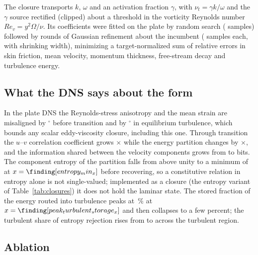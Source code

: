 \documentclass[lineno]{jfm}
\begin{document}
The closure transports $k$, $\omega$ and an activation fraction $\gamma$,
with $\nu_t = \gamma k/\omega$ and the $\gamma$ source rectified (clipped)
about a threshold in the vorticity Reynolds number $Re_v = y^2\Omega/\nu$.
Its \result[NFittedCoeffs]{} coefficients were fitted on the plate by random
search (\result[NRandom]{} samples) followed by \result[NRefineRounds]{}
rounds of Gaussian refinement about the incumbent (\result[NRefine]{}
samples each, with shrinking width), minimizing a target-normalized sum of
relative errors in skin friction, mean velocity, momentum thickness,
free-stream decay and turbulence energy.

\subsection{What the DNS says about the form}\label{sec:structure}

In the plate DNS the Reynolds-stress anisotropy and the mean strain are
misaligned by $^\circ$ before
transition and by $^\circ$ in
equilibrium turbulence, which bounds any scalar eddy-viscosity closure,
including this one. Through transition the $u$--$v$ correlation coefficient
grows $\times$ while the energy partition changes by
$\times$, and the information shared between the
velocity components grows from  to
 bits. The component entropy of
the partition falls from above unity to a minimum of 
at $x = \finding[entropy_min_x]$ before recovering, so a constitutive
relation in entropy alone is not single-valued; implemented as a closure
(the entropy variant of Table~\ref{tab:closures}) it does not hold the
laminar state. The stored fraction of the energy routed into turbulence
peaks at \,\% at
$x = \finding[peak_turbulent_storage_x]$ and then collapses to a few
percent; the turbulent share of entropy rejection rises from
 to
 across the turbulent region.

\subsection{Ablation}\label{sec:ablation}
\end{document}
